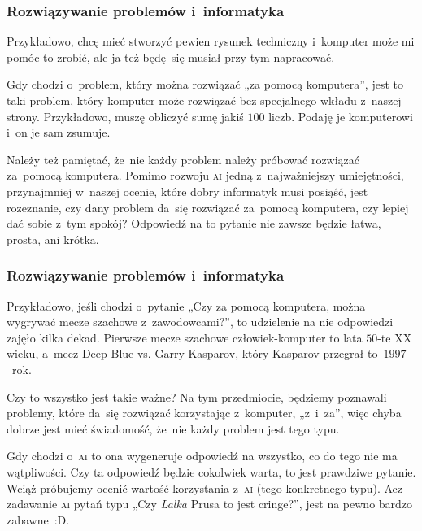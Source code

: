 \documentclass[10pt,t]{beamer}
\begin{document}
\begin{frame}
  \frametitle{Rozwiązywanie problemów i~informatyka}


  Przykładowo, chcę mieć stworzyć pewien rysunek techniczny i~komputer
  może mi pomóc to zrobić, ale ja też będę~się musiał przy tym napracować.

  Gdy chodzi o~problem, który można rozwiązać „za pomocą komputera”, jest to
  taki problem, który komputer może rozwiązać bez specjalnego wkładu
  z~naszej strony. Przykładowo, muszę obliczyć sumę jakiś $100$ liczb.
  Podaję je komputerowi i~on je sam zsumuje.

  Należy też pamiętać, że~nie każdy problem należy próbować rozwiązać
  za~pomocą komputera. Pomimo rozwoju \textsc{ai} jedną z~najważniejszy
  umiejętności, przynajmniej w~naszej ocenie, które dobry informatyk musi
  posiąść, jest rozeznanie, czy dany problem da~się rozwiązać za~pomocą
  komputera, czy lepiej dać sobie z~tym spokój? Odpowiedź na to pytanie nie
  zawsze będzie łatwa, prosta, ani krótka.

\end{frame}





\begin{frame}
  \frametitle{Rozwiązywanie problemów i~informatyka}


  Przykładowo, jeśli chodzi o~pytanie „Czy za pomocą komputera, można
  wygrywać mecze szachowe z~zawodowcami?”, to udzielenie na nie odpowiedzi
  zajęło kilka dekad. Pierwsze mecze szachowe człowiek-komputer to lata
  $50$-te XX wieku, a~mecz
  {Deep Blue vs. Garry Kasparov}, który Kasparov przegrał to~$1997$~rok.

  Czy to wszystko jest takie ważne? Na tym przedmiocie, będziemy poznawali
  problemy, które da~się rozwiązać korzystając z~komputer, „z~i~za”, więc
  chyba dobrze jest mieć świadomość, że~nie każdy problem jest tego typu.

  Gdy chodzi o~\textsc{ai} to ona wygeneruje odpowiedź na wszystko, co do
  tego nie ma wątpliwości. Czy ta odpowiedź będzie cokolwiek warta, to
  jest prawdziwe pytanie. Wciąż próbujemy ocenić wartość korzystania
  z~\textsc{ai} (tego konkretnego typu). Acz zadawanie \textsc{ai} pytań
  typu „Czy \textit{Lalka} Prusa to jest cringe?”, jest na pewno bardzo
  zabawne~:D.

\end{frame}
\end{document}
